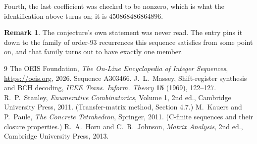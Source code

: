 \documentclass[11pt,a4paper]{article}
\theoremstyle{plain}
\theoremstyle{definition}
\newtheorem{remark}[theorem]{Remark}
\begin{document}
Fourth, the last coefficient was checked to be nonzero, which is what the identification above
turns on; it is $450868486864896$.

\begin{remark}
The conjecture's own statement was never read. The entry pins it down to the family of
order-$93$ recurrences this sequence satisfies from some point on, and that family turns
out to have exactly one member.
\end{remark}

\begin{thebibliography}{9}
 The OEIS Foundation, \emph{The On-Line Encyclopedia of Integer
Sequences}, \url{https://oeis.org}, 2026. Sequence A303466.
 J.~L.~Massey, Shift-register synthesis and BCH decoding, \emph{IEEE
Trans. Inform. Theory} \textbf{15} (1969), 122--127.
 R.~P.~Stanley, \emph{Enumerative Combinatorics}, Volume 1, 2nd ed.,
Cambridge University Press, 2011. (Transfer-matrix method, Section 4.7.)
 M.~Kauers and P.~Paule, \emph{The Concrete Tetrahedron}, Springer, 2011.
(C-finite sequences and their closure properties.)
 R.~A.~Horn and C.~R.~Johnson, \emph{Matrix Analysis}, 2nd ed., Cambridge
University Press, 2013.
\end{thebibliography}
\end{document}
